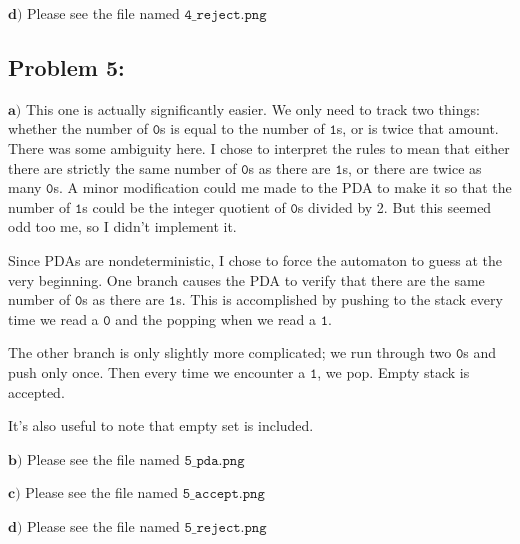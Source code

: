 \documentclass[a4paper]{article}
\begin{document}
$\textbf{d)}$ Please see the file named $\texttt{4\_reject.png}$

\subsection*{Problem 5:} $\textbf{a)}$
This one is actually significantly easier. We only need to track two things: whether the number of $\texttt{0}$s is equal to the number of $\texttt{1}$s, or is twice that amount. There was some ambiguity here. I chose to interpret the rules to mean that either there are strictly the same number of $\texttt{0}$s as there are $\texttt{1}$s, or there are twice as many $\texttt{0}$s. A minor modification could me made to the PDA to make it so that the number of $\texttt{1}$s could be the integer quotient of $\texttt{0}$s divided by 2. But this seemed odd too me, so I didn't implement it.

Since PDAs are nondeterministic, I chose to force the automaton to guess at the very beginning. One branch causes the PDA to verify that there are the same number of $\texttt{0}$s as there are $\texttt{1}$s. This is accomplished by pushing to the stack every time we read a $\texttt{0}$ and the popping when we read a $\texttt{1}$.

The other branch is only slightly more complicated; we run through two $\texttt{0}$s and push only once. Then every time we encounter a $\texttt{1}$, we pop. Empty stack is accepted.

It's also useful to note that empty set is included.

$\textbf{b)}$ Please see the file named $\texttt{5\_pda.png}$

$\textbf{c)}$ Please see the file named $\texttt{5\_accept.png}$

$\textbf{d)}$ Please see the file named $\texttt{5\_reject.png}$
\end{document}
